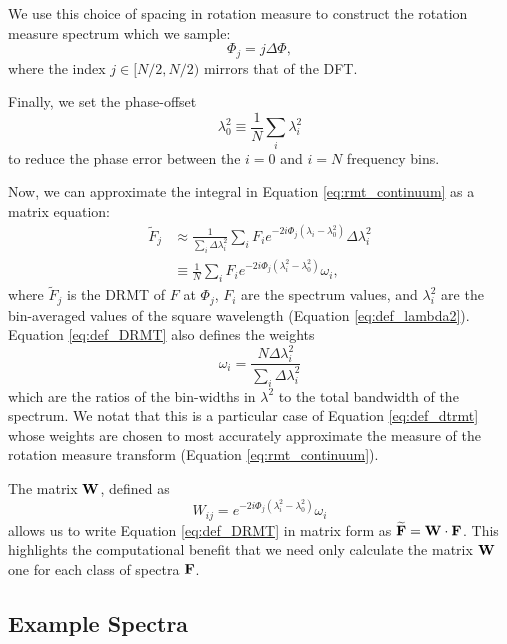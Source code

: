 We use this choice of spacing in rotation measure to construct the rotation measure spectrum which
we sample:
\begin{equation}
  \Phi_j = j\Delta\Phi,
\end{equation}
where the index $j\in[N/2, N/2)$ mirrors that of the DFT.

Finally, we set the phase-offset
\begin{equation}
  \lambda_0^2 \equiv \frac{1}{N}\sum_i\lambda_i^2
\end{equation}
to reduce the phase error between the $i=0$ and $i=N$ frequency bins.

Now, we can approximate the integral in Equation \ref{eq:rmt_continuum} as a matrix equation:
\begin{align}
  \widetilde{F}_j &\approx \frac{1}{\sum_i \Delta\lambda^2_i}
  \sum_i F_ie^{-2i\Phi_j(\lambda_i-\lambda_0^2)}\Delta\lambda_i^2
  \nonumber \\ &\equiv
  \frac{1}{N}\sum_iF_ie^{-2i\Phi_j(\lambda_i^2-\lambda_0^2)}\omega_i,
  \label{eq:def_DRMT}
\end{align}
where $\widetilde{F}_j$ is the DRMT of $F$ at $\Phi_j$, $F_i$ are the spectrum values, and
$\lambda^2_i$ are the bin-averaged values of the square wavelength (Equation \ref{eq:def_lambda2}).
Equation \ref{eq:def_DRMT} also defines the weights
\begin{equation}
  \omega_i = \frac{N\Delta\lambda_i^2}{\sum_i\Delta\lambda^2_i}
  \label{eq:def_omega}
\end{equation}
which are the ratios of the bin-widths in $\lambda^2$ to the total bandwidth of the spectrum. We
notat that this is a particular case of Equation \ref{eq:def_dtrmt} whose weights are chosen to most
accurately approximate the measure of the rotation measure transform (Equation \ref{eq:rmt_continuum}).

The matrix $\mathbf{W}$, defined as
\begin{equation}
  W_{ij} = e^{-2i\Phi_j(\lambda_i^2-\lambda_0^2)}\omega_i
  \label{eq:w_ij}
\end{equation}
allows us to write Equation \ref{eq:def_DRMT} in matrix form as $\widetilde{\mathbf{F}} =
\mathbf{W}\cdot\mathbf{F}$. This highlights the computational benefit that we need only calculate the matrix
$\mathbf{W}$ one for each class of spectra $\mathbf{F}$.

\subsection{Example Spectra}

